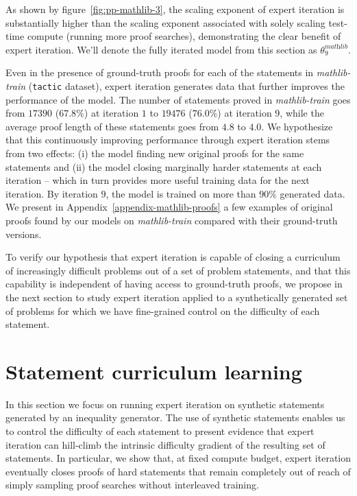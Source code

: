 \documentclass[nohyperref]{article}
\theoremstyle{plain}
\theoremstyle{definition}
\theoremstyle{remark}
\begin{document}
As shown by figure~\ref{fig:pp-mathlib-3}, the scaling exponent of expert iteration is substantially higher than the scaling exponent associated with solely scaling test-time compute (running more proof searches), demonstrating the clear benefit of expert iteration. We'll denote the fully iterated model from this section as $\theta_9^{\textit{mathlib}}$.

Even in the presence of ground-truth proofs for each of the statements in \textit{mathlib-train} (\texttt{tactic} dataset), expert iteration generates data that further improves the performance of the model. The number of statements proved in \textit{mathlib-train} goes from $17390$ ($67.8\%$) at iteration $1$ to $19476$ ($76.0\%$) at iteration 9, while the average proof length of these statements goes from $4.8$ to $4.0$. We hypothesize that this continuously improving performance through expert iteration stems from two effects: (i) the model finding new original proofs for the same statements and (ii) the model closing marginally harder statements at each iteration -- which in turn provides more useful training data for the next iteration. By iteration $9$, the model is trained on more than $90\%$ generated data. We present in Appendix~\ref{appendix-mathlib-proofs} a few examples of original proofs found by our models on \textit{mathlib-train} compared with their ground-truth versions. 

To verify our hypothesis that expert iteration is capable of closing a curriculum of increasingly difficult problems out of a set of problem statements, and that this capability is independent of having access to ground-truth proofs, we propose in the next section to study expert iteration applied to a synthetically generated set of problems for which we have fine-grained control on the difficulty of each statement.

\section{Statement curriculum learning}
\label{climbing}

In this section we focus on running expert iteration on synthetic statements generated by an inequality generator. The use of synthetic statements enables us to control the difficulty of each statement to present evidence that expert iteration can hill-climb the intrinsic difficulty gradient of the resulting set of statements. In particular, we show that, at fixed compute budget, expert iteration eventually closes proofs of hard statements that remain completely out of reach of simply sampling proof searches without interleaved training.
\end{document}
